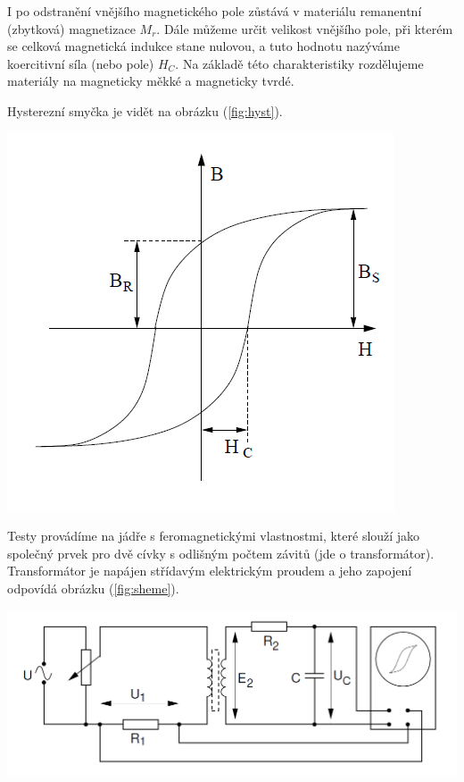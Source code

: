 \documentclass[a4paper,11pt]{article}
\begin{document}
    \hspace{10pt}
    \begin{minipage}[t]{0.5\textwidth} 
            I po odstranění vnějšího magnetického pole zůstává v materiálu remanentní (zbytková) magnetizace $M_r$. Dále můžeme určit velikost vnějšího pole, při kterém se celková magnetická indukce stane nulovou, a tuto hodnotu nazýváme koercitivní síla (nebo pole) $H_C$. Na základě této charakteristiky rozdělujeme materiály na magneticky měkké a magneticky tvrdé.
            \par Hysterezní smyčka je vidět na obrázku (\ref{fig:hyst}).
            \vspace{10pt}
            \par 
            \centering
            \includegraphics[scale=0.7]{hyst}
            \captionsetup{justification=centering, font=footnotesize}
            \label{fig:hyst}
            \vspace{10pt}
            \raggedright
            Testy provádíme na jádře s feromagnetickými vlastnostmi, které slouží jako společný prvek pro dvě cívky s odlišným počtem závitů (jde o transformátor). Transformátor je napájen střídavým elektrickým proudem a jeho zapojení odpovídá obrázku (\ref{fig:sheme}).
            \vspace{10pt}
            \par 
            \centering
            \includegraphics[scale=0.3]{sheme}

\end{minipage}
\end{document}
